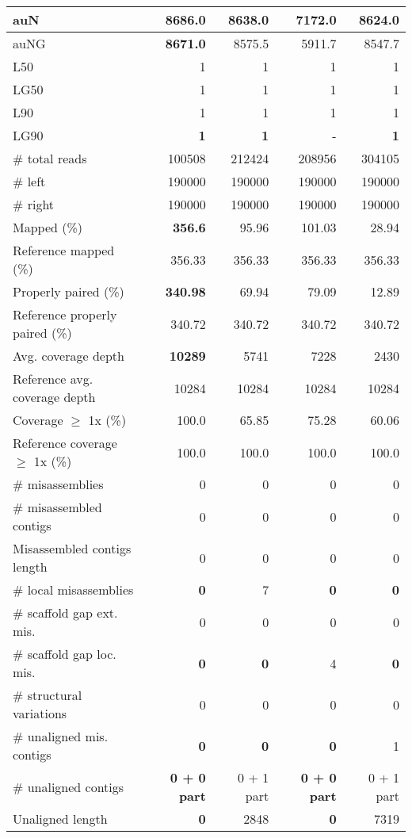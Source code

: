 \documentclass[12pt,a4paper]{article}
\begin{document}
\begin{table}[ht]
\begin{center}
\begin{tabular}{|l*{4}{|r}|}
auN & {\bf 8686.0} & 8638.0 & 7172.0 & 8624.0 \\ \hline
auNG & {\bf 8671.0} & 8575.5 & 5911.7 & 8547.7 \\ \hline
L50 & 1 & 1 & 1 & 1 \\ \hline
LG50 & 1 & 1 & 1 & 1 \\ \hline
L90 & 1 & 1 & 1 & 1 \\ \hline
LG90 & {\bf 1} & {\bf 1} & - & {\bf 1} \\ \hline
\# total reads & 100508 & 212424 & 208956 & 304105 \\ \hline
\# left & 190000 & 190000 & 190000 & 190000 \\ \hline
\# right & 190000 & 190000 & 190000 & 190000 \\ \hline
Mapped (\%) & {\bf 356.6} & 95.96 & 101.03 & 28.94 \\ \hline
Reference mapped (\%) & 356.33 & 356.33 & 356.33 & 356.33 \\ \hline
Properly paired (\%) & {\bf 340.98} & 69.94 & 79.09 & 12.89 \\ \hline
Reference properly paired (\%) & 340.72 & 340.72 & 340.72 & 340.72 \\ \hline
Avg. coverage depth & {\bf 10289} & 5741 & 7228 & 2430 \\ \hline
Reference avg. coverage depth & 10284 & 10284 & 10284 & 10284 \\ \hline
Coverage $\geq$ 1x (\%) & 100.0 & 65.85 & 75.28 & 60.06 \\ \hline
Reference coverage $\geq$ 1x (\%) & 100.0 & 100.0 & 100.0 & 100.0 \\ \hline
\# misassemblies & 0 & 0 & 0 & 0 \\ \hline
\# misassembled contigs & 0 & 0 & 0 & 0 \\ \hline
Misassembled contigs length & 0 & 0 & 0 & 0 \\ \hline
\# local misassemblies & {\bf 0} & 7 & {\bf 0} & {\bf 0} \\ \hline
\# scaffold gap ext. mis. & 0 & 0 & 0 & 0 \\ \hline
\# scaffold gap loc. mis. & {\bf 0} & {\bf 0} & 4 & {\bf 0} \\ \hline
\# structural variations & 0 & 0 & 0 & 0 \\ \hline
\# unaligned mis. contigs & {\bf 0} & {\bf 0} & {\bf 0} & 1 \\ \hline
\# unaligned contigs & {\bf 0 + 0 part} & 0 + 1 part & {\bf 0 + 0 part} & 0 + 1 part \\ \hline
Unaligned length & {\bf 0} & 2848 & {\bf 0} & 7319 \\ \hline

\end{tabular}
\end{center}
\end{table}
\end{document}
